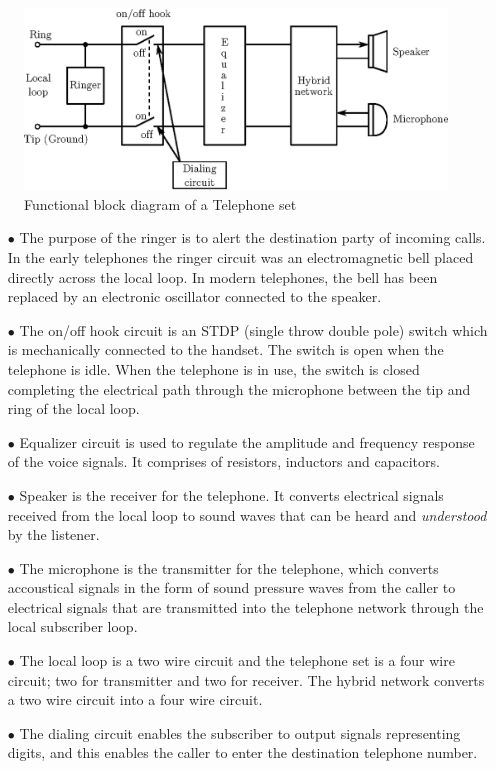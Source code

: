 \begin{figure}[H]
\centering
\includegraphics[scale=.9]{chap10/fig10.2.eps}
\caption{Functional block diagram of a Telephone set}\label{fig10.2}
\end{figure}
\begin{itemize}
\item[$\bullet$]
The purpose of the ringer is to alert the destination party of incoming calls. In the early telephones the ringer circuit was an electromagnetic bell placed directly across the local loop. In modern telephones, the bell has been replaced by an electronic oscillator connected to the speaker.

\item[$\bullet$]
The on/off hook circuit is an STDP (single throw double pole) switch which is mechanically connected to the handset. The switch is open when the telephone is idle. When the telephone is in use, the switch is closed completing the electrical path through the microphone between the tip and ring of the local loop.

\item[$\bullet$]
Equalizer circuit is used to regulate the amplitude and frequency response of the voice signals. It comprises of resistors, inductors and capacitors.

\item[$\bullet$]
Speaker is the receiver for the telephone. It converts electrical signals received from the local loop to sound waves that can be heard and {\em understood} by the listener. 

\item[$\bullet$]
The microphone is the transmitter for the telephone, which converts accoustical signals in the form of sound pressure waves from the caller to electrical signals that are transmitted into the telephone network through the local subscriber loop.

\item[$\bullet$]
The local loop is a two wire circuit and the telephone set is a four wire circuit; two for transmitter and two for receiver. The hybrid network converts a two wire circuit into a four wire circuit.

\item[$\bullet$]
The dialing circuit enables the subscriber to output signals representing digits, and this enables the caller to enter the destination telephone number.
\end{itemize}

